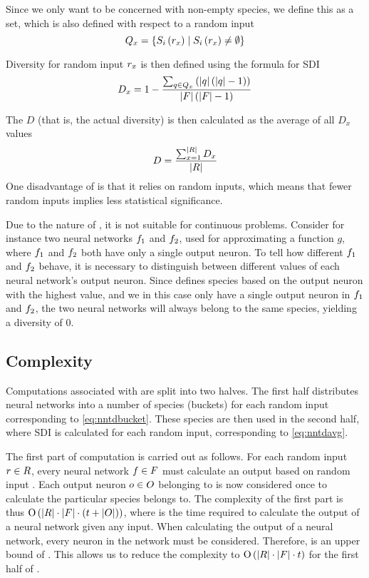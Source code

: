 Since we only want to be concerned with non-empty species, we define this as a set, which is also defined with respect to a random input
\begin{equation*}\label{eq:nonemptyspecies}
  Q_{x} = \left\{ S_{i}\left(r_x\right) \mid S_{i}\left(r_x\right) \neq \emptyset \right\}
\end{equation*}

Diversity for random input $r_x$ is then defined using the formula for SDI\cite{Venturi2007182}
%
\begin{equation*}\label{eq:nntd}
  D_x = 1 - \frac{\sum_{q \in Q_{x}}\left(\lvert q\rvert\left(\lvert q\rvert - 1\right)\right)}{\lvert F\rvert\left(\lvert F\rvert - 1\right)}
\end{equation*}
%

The \dia{} $D$ (that is, the actual diversity) is then calculated as the average of all $D_x$ values
%
\begin{equation}\label{eq:nntdavg}
  D =\frac{\sum_{x=1}^{\lvert R\rvert}{D_x}}{\lvert R\rvert}
\end{equation}
%
One disadvantage of \dia{} is that it relies on random inputs, which means that fewer random inputs implies less statistical significance. 

Due to the nature of \dia, it is not suitable for continuous problems. Consider for instance two neural networks $f_1$ and $f_2$, used for approximating a function $g$, where $f_1$ and $f_2$ both have only a single output neuron. To tell how different $f_1$ and $f_2$ behave, it is necessary to distinguish between different values of each neural network's output neuron. Since \dia{} defines species based on the output neuron with the highest value, and we in this case only have a single output neuron in $f_1$ and $f_2$, the two neural networks will always belong to the same species, yielding a diversity of 0.  

\subsection{Complexity}
Computations associated with \dia{} are split into two halves. The first half distributes neural networks into a number of species (buckets) for each random input corresponding to \cref{eq:nntdbucket}. These species are then used in the second half, where SDI is calculated for each random input, corresponding to \cref{eq:nntdavg}.

The first part of computation is carried out as follows. For each random input $r \in R$, every neural network $f \in F$ must calculate an output based on random input \ran. Each output neuron $o \in O$ belonging to \ind{} is now considered once to calculate the particular species \ind{} belongs to. The complexity of the first part is thus $\operatorname{O}\left(\lvert R\rvert \cdot \lvert F\rvert \cdot \left(t + \lvert O\rvert\right)\right)$, where \timet{} is the time required to calculate the output of a neural network given any input. When calculating the output of a neural network, every neuron in the network must be considered. Therefore, \timet{} is an upper bound of \nnoutsetl. This allows us to reduce the complexity to $\operatorname{O}\left(\lvert R\rvert \cdot \lvert F\rvert \cdot t\right)$ for the first half of \dia.

